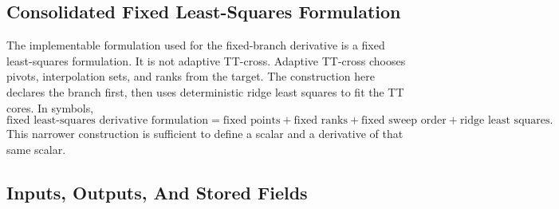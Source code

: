 \documentclass[11pt]{article}
\numberwithin{equation}{section}
\begin{document}
\subsection{Consolidated Fixed Least-Squares Formulation}

The implementable formulation used for the fixed-branch derivative is a fixed
least-squares formulation.  It is not adaptive TT-cross.  Adaptive TT-cross chooses
pivots, interpolation sets, and ranks from the target.  The construction here declares
the branch first, then uses deterministic ridge least squares to fit the TT
cores.  In symbols,
\begin{equation}
    \text{fixed least-squares derivative formulation}
    =
    \text{fixed points}
    +
    \text{fixed ranks}
    +
    \text{fixed sweep order}
    +
    \text{ridge least squares}.
    \label{eq:p25-ls-1}
\end{equation}
This narrower construction is sufficient to define a scalar and a derivative of that
same scalar.

\subsection{Inputs, Outputs, And Stored Fields}
\end{document}
